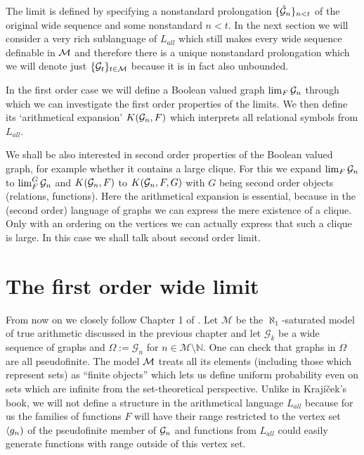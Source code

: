 \vspace{1em}
The limit is defined by specifying a nonstandard prolongation $\{\tilde {\mathcal{G}}_n\}_{n<t}$ of the original wide sequence and some nonstandard $n < t$. In the next section we will consider a very rich sublanguage of $L_{all}$ which still makes every wide sequence definable in $\mathcal{M}$ and therefore there is a unique nonstandard prolongation which we will denote just $\{\mathcal{G}_t\}_{t\in\mathcal{M}}$ because it is in fact also unbounded.

In the first order case we will define a Boolean valued graph $\lim_F\mathcal{G}_n$ through which we can investigate the first order properties of the limits. We then define its `arithmetical expansion' $K(\mathcal{G}_n,F)$ which interprets all relational symbols from $L_{all}$. 

We shall be also interested in second order properties of the Boolean valued graph,
for example whether it contains a large clique.  For this we expand
$\lim_F\mathcal{G}_n$ to $\lim_F^G\mathcal{G}_n$ and $K(\mathcal{G}_n,F)$ to $K(\mathcal{G}_n,F,G)$ with $G$ being second order objects (relations, functions). Here the arithmetical expansion is essential, because in the (second order) language of graphs we can express the mere existence of a clique. Only with an ordering on the vertices we can actually express that such a clique is large. In this case we shall talk about second order limit.

\section{The first order wide limit}



From now on we closely follow Chapter 1 of \cite{krajicek2010forcing}. Let $\mathcal{M}$ be the $\aleph_1$-saturated model of true arithmetic discussed in the previous chapter and let $\mathcal{G}_k$ be a wide sequence of graphs and $\Omega:=\mathcal{G}_n$ for $n\in\mathcal{M}\setminus \mathbb{N}$. One can check that graphs in $\Omega$ are all pseudofinite. The model $\mathcal{M}$ treats all its elements (including those which represent sets) as ``finite objects'' which lets us define uniform probability even on sets which are infinite from the set-theoretical perspective. Unlike in Krajíček's book, we will not define a structure in the arithmetical language $L_{all}$ because for us the families of functions $F$ will have their range restricted to the vertex set $\langle g_n)$ of the pseudofinite member of $\mathcal{G}_n$ and functions from $L_{all}$ could easily generate functions with range outside of this vertex set.


